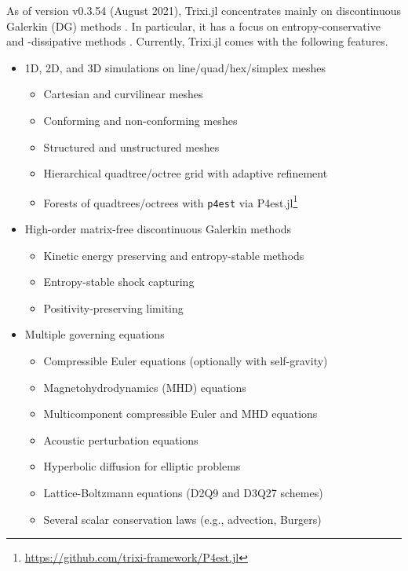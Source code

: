 \documentclass{juliacon}
\makeatletter
\newcommand{\eg}[0]{{e.g.\@}\xspace}
\newcommand{\trixi}{Trixi.jl\xspace}
\makeatother
\begin{document}
As of version v0.3.54 (August 2021), \trixi concentrates mainly on discontinuous
Galerkin (DG) methods \cite{hesthaven2007nodal, kopriva2009implementing}.
In particular, it has a focus on entropy-conservative and -dissipative methods
\cite{tadmor1987numerical, lefloch2002fully, fisher2013discretely,
ranocha2018comparison, chen2017entropy}. Currently, \trixi comes with the
following features.
\begin{itemize}
  \item 1D, 2D, and 3D simulations on line/quad/hex/simplex meshes
  \begin{itemize}
    \item Cartesian and curvilinear meshes
    \item Conforming and non-conforming meshes
    \item Structured and unstructured meshes
    \item Hierarchical quadtree/octree grid with adaptive refinement
    \item Forests of quadtrees/octrees with \texttt{p4est} \cite{burstedde2011p4est}
          via P4est.jl\footnote{\url{https://github.com/trixi-framework/P4est.jl}}
  \end{itemize}

  \item High-order matrix-free discontinuous Galerkin methods
  \begin{itemize}
    \item Kinetic energy preserving and entropy-stable methods
    \item Entropy-stable shock capturing
    \item Positivity-preserving limiting
  \end{itemize}

  \item Multiple governing equations
  \begin{itemize}
    \item Compressible Euler equations (optionally with self-gravity)
    \item Magnetohydrodynamics (MHD) equations
    \item Multicomponent compressible Euler and MHD equations
    \item Acoustic perturbation equations
    \item Hyperbolic diffusion for elliptic problems
    \item Lattice-Boltzmann equations (D2Q9 and D3Q27 schemes)
    \item Several scalar conservation laws (\eg, advection, Burgers)
  \end{itemize}


\end{itemize}
\end{document}
